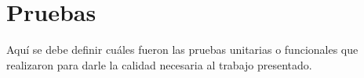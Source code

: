\section{Pruebas}

Aquí se debe definir cuáles fueron las pruebas unitarias o funcionales que realizaron para darle la calidad necesaria al trabajo presentado.
